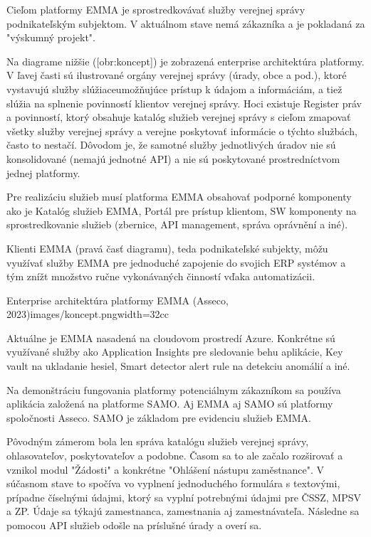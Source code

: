 Cieľom platformy EMMA je sprostredkovávať služby verejnej správy podnikateľským subjektom. V aktuálnom stave nemá zákazníka a je pokladaná za "výskumný projekt".

Na diagrame nižšie ([obr:koncept]) je zobrazená enterprise architektúra platformy. V ľavej časti sú ilustrované orgány verejnej správy (úrady, obce a pod.), ktoré vystavujú služby slúžiaceumožňujúce prístup k údajom a informáciám, a tiež slúžia na splnenie povinností klientov verejnej správy. Hoci existuje Register práv a povinností, ktorý obsahuje katalóg služieb verejnej správy s cieľom zmapovať všetky služby verejnej správy a verejne poskytovať informácie o týchto službách, často to nestačí. Dôvodom je, že samotné služby jednotlivých úradov nie sú konsolidované (nemajú jednotné API) a nie sú poskytované prostredníctvom jednej platformy.

Pre realizáciu služieb musí platforma EMMA obsahovať podporné komponenty ako je Katalóg služieb EMMA, Portál pre prístup klientom, SW komponenty na sprostredkovanie služieb (zbernice, API management, správa oprávnění a iné). 

Klienti EMMA (pravá časť diagramu), teda podnikateľské subjekty, môžu využívať služby EMMA pre jednoduché zapojenie do svojich ERP systémov a tým znížt množstvo ručne vykonávaných činností vďaka automatizácii.

{Enterprise architektúra platformy EMMA  (Asseco, 2023)}{images/koncept.png}{width=32cc}

Aktuálne je EMMA nasadená na cloudovom prostredí Azure. Konkrétne sú využívané služby ako Application Insights pre sledovanie behu aplikácie, Key vault na ukladanie hesiel, Smart detector alert rule na detekciu anomálií a iné. 

Na demonštráciu fungovania platformy potenciálnym zákazníkom sa používa aplikácia založená na platforme SAMO. Aj EMMA aj SAMO sú platformy spoločnosti Asseco. SAMO je základom pre evidenciu služieb EMMA. 

Pôvodným zámerom bola len správa katalógu služieb verejnej správy, ohlasovateľov, poskytovateľov a podobne. Časom sa to ale začalo rozširovať a vznikol modul "Žádosti" a konkrétne "Ohlášení nástupu zaměstnance". V súčasnom stave to spočíva vo vyplnení jednoduchého formulára s textovými, prípadne číselnými údajmi, ktorý sa vyplní potrebnými údajmi pre ČSSZ, MPSV a ZP. Údaje sa týkajú zamestnanca, zamestnania aj zamestnávateľa. Následne sa pomocou API služieb odošle na príslušné úrady a overí sa.

